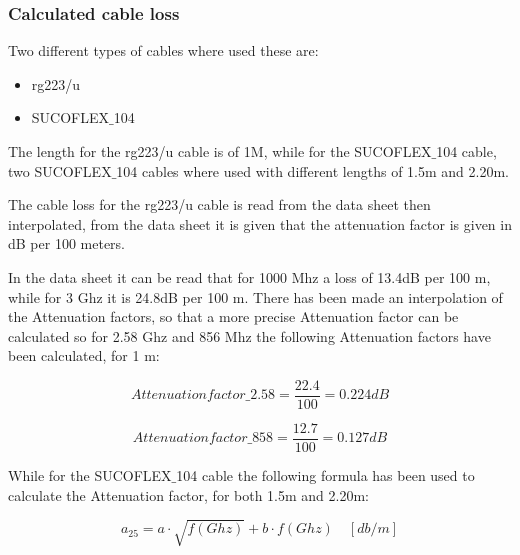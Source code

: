 \subsubsection{Calculated cable loss}
Two different types of cables where used these are:

\begin{itemize}
\item rg223/u 
\item SUCOFLEX$\_$104
\end{itemize}

The length for the  rg223/u cable is of 1M, while for the SUCOFLEX$\_$104 cable, two SUCOFLEX$\_$104 cables where used with different lengths of 1.5m and 2.20m.

The cable loss for the rg223/u cable is read from the data sheet then interpolated, from the data sheet it is given that the attenuation factor is given in dB per 100 meters. 


In the data sheet it can be read that for 1000 Mhz a loss of  13.4dB per 100 m, while for 3 Ghz it is 24.8dB per 100 m. There has been made an interpolation of the Attenuation factors, so that a more precise Attenuation factor can be calculated so for 2.58 Ghz and 856 Mhz the following Attenuation factors have been calculated, for 1 m:

\begin{equation}
Attenuation factor\_2.58 = \frac{22.4}{100}  = 0.224dB
\end{equation}

\begin{equation}
Attenuation factor\_858 = \frac{12.7}{100}  = 0.127dB
\end{equation}

While for the SUCOFLEX$\_$104 cable the following formula has been used to calculate the Attenuation factor, for both 1.5m and 2.20m:

\begin{equation}
a_{25} = a\cdot \sqrt{f(Ghz)} + b \cdot f(Ghz) \quad [db/m]
\end{equation}

\begin{where}
\end{where}

